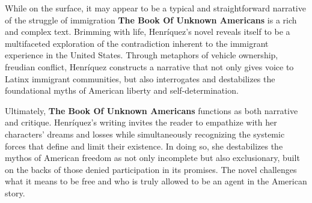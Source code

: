 \documentclass{article}
\begin{document}
While on the surface, it may appear to be a typical and straightforward narrative of the struggle of immigration  \textbf{\textbf{The Book Of Unknown Americans} }is a rich and complex text. Brimming with life, Henríquez’s novel reveals itself to be a multifaceted exploration of the contradiction inherent to the immigrant experience in the United States. Through metaphors of vehicle ownership, freudian conflict, Henríquez constructs a narrative that not only gives voice to Latinx immigrant communities, but also interrogates and destabilizes the foundational myths of American liberty and self-determination.  

Ultimately, \textbf{The Book Of Unknown Americans} functions as both narrative and critique. Henríquez’s writing invites the reader to empathize with her characters’ dreams and losses while simultaneously recognizing the systemic forces that define and limit their existence. In doing so, she destabilizes the mythos of American freedom as not only incomplete but also exclusionary, built on the backs of those denied participation in its promises. The novel challenges what it means to be free and who is truly allowed to be an agent in the American story.

\pagebreak

\printbibliography
\end{document}
